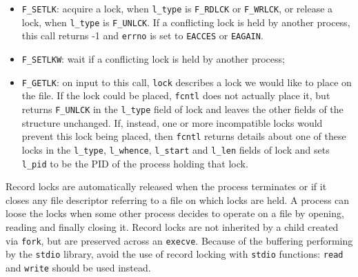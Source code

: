 \begin{itemize}
\item \texttt{F\_SETLK}: acquire a lock, when \texttt{l\_type} is \texttt{F\_RDLCK} or \texttt{F\_WRLCK}, or release a lock, when \texttt{l\_type} is \texttt{F\_UNLCK}. If a conflicting lock is held by another process, this call returns -1 and \texttt{errno} is set to \texttt{EACCES} or \texttt{EAGAIN}.
\item \texttt{F\_SETLKW}: wait if a conflicting lock is held by another process;
\item \texttt{F\_GETLK}: on input to this call, \texttt{lock} describes a lock we would like to place on the file. If the lock could be placed, \texttt{fcntl} does not actually place it, but returns \texttt{F\_UNLCK} in the \texttt{l\_type} field of lock and leaves the other fields of the structure unchanged. If, instead, one or more incompatible locks would prevent this lock being placed, then \texttt{fcntl} returns details about one of these locks in the \texttt{l\_type}, \texttt{l\_whence}, \texttt{l\_start} and \texttt{l\_len} fields of lock and sets \texttt{l\_pid} to be the PID of the process holding that lock.
\end{itemize}

Record locks are automatically released when the process terminates or if it closes any file descriptor referring to a file on which locks are held. A process can loose the locks when some other process decides to operate on a file by opening, reading and finally closing it. Record locks are not inherited by a child created via \texttt{fork}, but are preserved across an \texttt{execve}. Because of the buffering performing by the \texttt{stdio} library, avoid the use of record locking with \texttt{stdio} functions: \texttt{read} and \texttt{write} should be used instead.